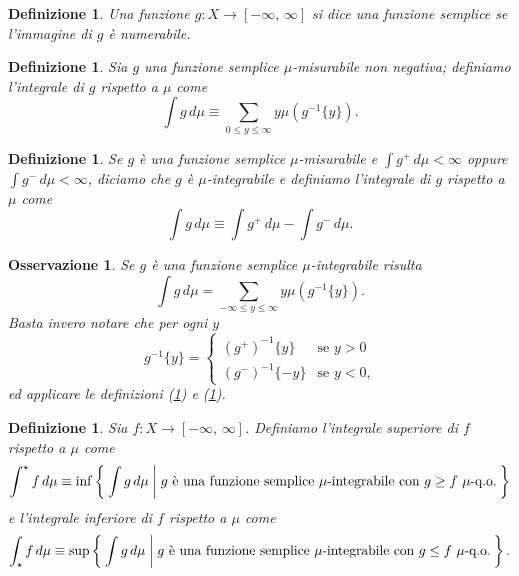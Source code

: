 \documentclass[a4paper,10pt,openright,oneside]{book}
\theoremstyle{theoremstyle}
\theoremstyle{theoremstylewoheader}
\theoremstyle{theoremstyle}
\newtheorem{definizione}[teorema]{Definizione}
\newtheorem{osservazione}[teorema]{Osservazione}
\theoremstyle{proofsecstyle}
\theoremstyle{nonumberplain}
\newcommand{\qo}[1]{\ensuremath{#1\text{-q.o.}}}
\begin{document}
\begin{definizione}
\label{def:funzione_semplice}
Una funzione $g : X \rightarrow [-\infty,\, \infty]$ si dice una \emph{funzione semplice} se l'immagine di $g$ è numerabile.
\end{definizione}

\begin{definizione}
\label{def:integrale_funzione_semplice_non_negativa}
Sia $g$ una funzione semplice $\mu$-misurabile non negativa; definiamo l'\emph{integrale} di $g$ rispetto a $\mu$ come
\[
\int g\, d\mu \equiv \sum_{0 \le y \le \infty} y\mu(g^{-1}\{y\}).
\]
\end{definizione}

\begin{definizione}
\label{def:integrale_funzione_semplice}
Se $g$ è una funzione semplice $\mu$-misurabile e $\int g^+\, d\mu < \infty$ oppure $\int g^-\, d\mu < \infty$, diciamo che $g$ è \emph{$\mu$-integrabile} e definiamo l'\emph{integrale} di $g$ rispetto a $\mu$ come
\[
\int g\, d\mu \equiv \int g^+\, d\mu - \int g^-\, d\mu.
\]
\end{definizione}

\begin{osservazione}
Se $g$ è una funzione semplice $\mu$-integrabile risulta
\[
\int g\, d\mu = \sum_{-\infty \le y \le \infty} y\mu(g^{-1}\{y\}).
\]
Basta invero notare che per ogni $y$
\[
g^{-1}\{y\} =
\begin{cases}
(g^+)^{-1}\{y\} & \text{se $y > 0$}\\
(g^-)^{-1}\{-y\} & \text{se $y < 0$,}
\end{cases}
\]
ed applicare le definizioni (\ref{def:integrale_funzione_semplice_non_negativa}) e (\ref{def:integrale_funzione_semplice}).
\end{osservazione}

\begin{definizione}
\label{def:integrali_superiore_inferiore}
Sia $f : X \rightarrow [-\infty,\, \infty]$. Definiamo l'\emph{integrale superiore} di $f$ rispetto a $\mu$ come
\[
\int^\star f\, d\mu \equiv \inf\Set{ \int g\, d\mu | g \text{ è una funzione semplice $\mu$-integrabile con $g \ge f$ $\qo{\mu}$} }
\]
e l'\emph{integrale inferiore} di $f$ rispetto a $\mu$ come
\[
\int_\star f\, d\mu \equiv \sup\Set{ \int g\, d\mu | g \text{ è una funzione semplice $\mu$-integrabile con $g \le f$ $\qo{\mu}$} }.
\]
\end{definizione}
\end{document}
